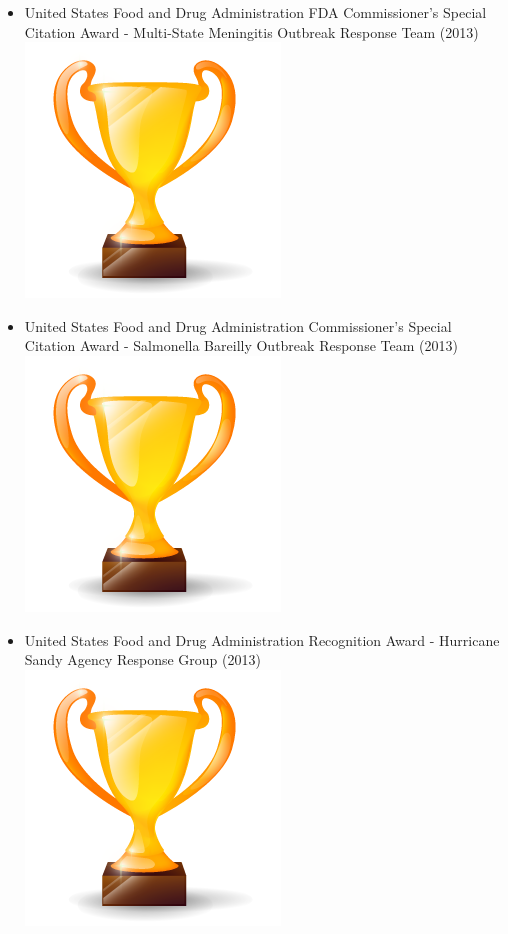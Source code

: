 \documentclass[letterpaper]{twentysecondcv} %
\begin{document}
{{\begin{itemize}
\item	United States Food and Drug Administration FDA Commissioner's Special Citation Award - Multi-State Meningitis Outbreak Response Team (2013)	\includegraphics[scale=0.05]{img/trophy.png}
\item	United States Food and Drug Administration Commissioner’s Special Citation Award - Salmonella Bareilly Outbreak Response Team (2013)	\includegraphics[scale=0.05]{img/trophy.png}
\item	United States Food and Drug Administration Recognition Award - Hurricane Sandy Agency Response Group (2013)	\includegraphics[scale=0.05]{img/trophy.png}

\end{itemize}}}
\end{document}
